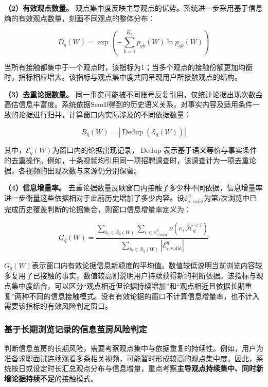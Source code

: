\textbf{（2）有效观点数量。} 观点集中度反映主导观点的优势。系统进一步采用基于信息熵的有效观点数量，刻画不同观点的整体分布：

\begin{equation}
D_q(W)=\exp\left(-\sum_{k=1}^{K_q}p_{qk}(W)\ln p_{qk}(W)\right)
\label{eq:2-5}
\end{equation}

当所有接触都集中于一个观点时，该指标为1；当多个观点的接触份额更加均衡时，指标相应增大。该指标与观点集中度共同呈现用户所接触观点的结构。

\textbf{（3）去重论据数量。} 同一事实可能被不同账号反复引用，仅统计论据出现次数会高估信息丰富度。系统依据SemIf得到的历史语义关系，对事实内容及适用条件一致的论据进行归并，计算窗口内实际涉及的不同依据数量：

\begin{equation}
B_q(W)=\left|\operatorname{Dedup}(\mathcal E_q(W))\right|
\label{eq:2-6}
\end{equation}

其中，\(\mathcal E_q(W)\)为窗口内的论据出现记录，\(\operatorname{Dedup}\)表示基于语义等价与事实条件的去重操作。例如，十条视频均引用同一项招聘调查时，该调查计为一项去重论据，各视频的出现次数与来源仍分别保留。

\textbf{（4）信息增量率。} 去重论据数量反映窗口内接触了多少种不同依据，信息增量率进一步衡量这些依据相对于此前历史增加了多少内容。设\(\mathcal E_{i,\mathrm{valid}}^q\)为第\(i\)次浏览中已完成历史覆盖判断的论据集合，则窗口信息增量率定义为：

\begin{equation}
G_q(W)=\frac{\displaystyle\sum_{b_i\in\mathcal B_q(W)}\sum_{e\in\mathcal E_{i,\mathrm{valid}}^q}\nu(e,\mathcal H_q^{<i})}{\displaystyle\sum_{b_i\in\mathcal B_q(W)}|\mathcal E_{i,\mathrm{valid}}^q|}
\label{eq:2-7}
\end{equation}

\(G_q(W)\)表示窗口内有效论据信息新颖度的平均值。数值较低说明当前浏览内容较多复用了已接触的事实，数值较高则说明用户持续获得新的判断依据。该指标与观点集中度结合，可以区分``观点相近但论据持续增加''和``观点相近且依据长期重复''两种不同的信息接触模式。没有有效论据的窗口不计算信息增量率，也不计入需要该指标的有效风险判定窗口。

\subsubsection{基于长期浏览记录的信息茧房风险判定}\label{section:2.2.5}

判断信息茧房的长期风险，需要考察观点集中与依据重复的持续性。例如，用户为准备求职面试连续观看多条相关视频，可能暂时形成较高的观点集中度。因此，系统按日或设定时长汇总观点分布与信息增量，重点考察\textbf{主导观点持续集中、同时新增论据持续不足}的接触模式。

